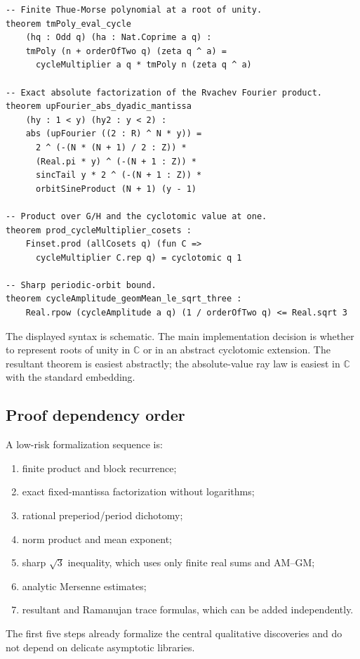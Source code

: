 \documentclass[11pt,oneside]{article}
\theoremstyle{definition}
\theoremstyle{remark}
\newcommand{\C}{\mathbb C}
\begin{document}
\begin{lstlisting}[style=pseudo,caption={Indicative Lean theorem interfaces.}]
-- Finite Thue-Morse polynomial at a root of unity.
theorem tmPoly_eval_cycle
    (hq : Odd q) (ha : Nat.Coprime a q) :
    tmPoly (n + orderOfTwo q) (zeta q ^ a) =
      cycleMultiplier a q * tmPoly n (zeta q ^ a)

-- Exact absolute factorization of the Rvachev Fourier product.
theorem upFourier_abs_dyadic_mantissa
    (hy : 1 < y) (hy2 : y < 2) :
    abs (upFourier ((2 : R) ^ N * y)) =
      2 ^ (-(N * (N + 1) / 2 : Z)) *
      (Real.pi * y) ^ (-(N + 1 : Z)) *
      sincTail y * 2 ^ (-(N + 1 : Z)) *
      orbitSineProduct (N + 1) (y - 1)

-- Product over G/H and the cyclotomic value at one.
theorem prod_cycleMultiplier_cosets :
    Finset.prod (allCosets q) (fun C =>
      cycleMultiplier C.rep q) = cyclotomic q 1

-- Sharp periodic-orbit bound.
theorem cycleAmplitude_geomMean_le_sqrt_three :
    Real.rpow (cycleAmplitude a q) (1 / orderOfTwo q) <= Real.sqrt 3
\end{lstlisting}

The displayed syntax is schematic. The main implementation decision is whether to
represent roots of unity in $\C$ or in an abstract cyclotomic extension. The
resultant theorem is easiest abstractly; the absolute-value ray law is easiest in
$\C$ with the standard embedding.

\subsection{Proof dependency order}

A low-risk formalization sequence is:
\begin{enumerate}
 \item finite product and block recurrence;
 \item exact fixed-mantissa factorization without logarithms;
 \item rational preperiod/period dichotomy;
 \item norm product and mean exponent;
 \item sharp $\sqrt3$ inequality, which uses only finite real sums and AM--GM;
 \item analytic Mersenne estimates;
 \item resultant and Ramanujan trace formulas, which can be added independently.
\end{enumerate}
The first five steps already formalize the central qualitative discoveries and do
not depend on delicate asymptotic libraries.
\end{document}
